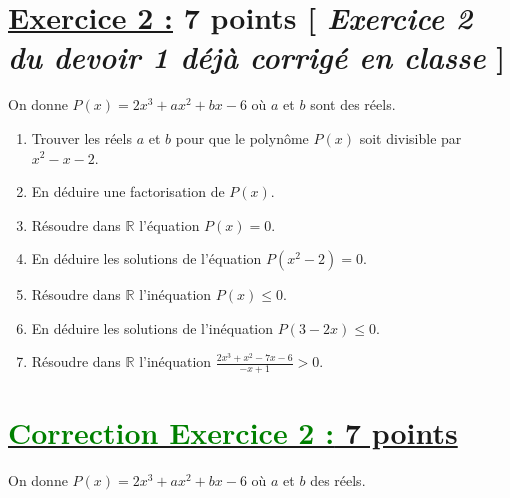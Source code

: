 \documentclass[12pt,a4paper]{article}
\begin{document}
\section*{\underline{Exercice 2 :} 7 points [\textit{ Exercice 2 du devoir 1 déjà corrigé en classe } ]}

On donne \( P(x) = 2x^3 + ax^2 + bx - 6 \) où \( a \) et \( b \) sont des réels.
\begin{enumerate}
    \item Trouver les réels \( a \) et \( b \) pour que le polynôme \( P(x) \) soit divisible par \( x^2 - x - 2 \).
    \item En déduire une factorisation de \( P(x) \).
    \item Résoudre dans \( \mathbb{R} \) l'équation \( P(x) = 0 \).
    \item En déduire les solutions de l'équation \( P(x^2 - 2) = 0 \).
    \item Résoudre dans \( \mathbb{R} \) l'inéquation \( P(x) \leq 0 \).
    \item En déduire les solutions de l'inéquation \( P(3 - 2x) \leq 0 \).
    \item Résoudre dans \( \mathbb{R} \) l'inéquation \( \frac{2x^3 + x^2 - 7x - 6}{-x + 1} > 0 \).
\end{enumerate}
\section*{\underline{\textcolor{green}{Correction Exercice 2 :} 7 points}}

On donne \( P(x) = 2x^3 + ax^2 + bx - 6 \) où \( a \) et \( b \) des réels.
\end{document}
